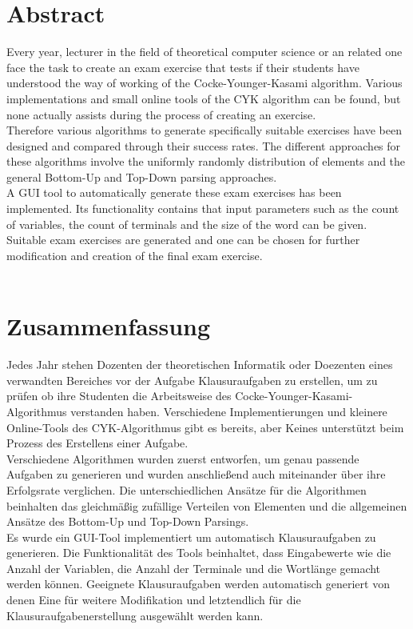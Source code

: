 \section*{Abstract}\label{abtract}
Every year, lecturer in the field of theoretical computer science or an related one face the task to create an exam exercise that tests if their students have understood the way of working of the Cocke-Younger-Kasami algorithm. Various implementations and small online tools of the CYK algorithm can be found, but none actually assists during the process of creating an exercise.\\
Therefore various algorithms to generate specifically suitable exercises have been designed and compared through their success rates. The different approaches for these algorithms involve the uniformly randomly distribution of elements and the general Bottom-Up and Top-Down parsing approaches.\\
A GUI tool to automatically generate these exam exercises has been implemented. Its functionality contains that input parameters such as the count of variables, the count of terminals and the size of the word can be given. Suitable exam exercises are generated and one can be chosen for further modification and creation of the final exam exercise.\\


~~

\section*{Zusammenfassung}\label{zusammenfassung}
Jedes Jahr stehen Dozenten der theoretischen Informatik oder Doezenten eines verwandten Bereiches vor der Aufgabe Klausuraufgaben zu erstellen, um zu prüfen ob ihre Studenten die Arbeitsweise des Cocke-Younger-Kasami-Algorithmus verstanden haben. Verschiedene Implementierungen und kleinere Online-Tools des CYK-Algorithmus gibt es bereits, aber Keines unterstützt beim Prozess des Erstellens einer Aufgabe.\\
Verschiedene Algorithmen wurden zuerst entworfen, um genau passende Aufgaben zu generieren und wurden anschließend auch miteinander über ihre Erfolgsrate verglichen. Die unterschiedlichen Ansätze für die Algorithmen beinhalten das gleichmäßig zufällige Verteilen von Elementen und die allgemeinen Ansätze des Bottom-Up und Top-Down Parsings.\\
Es wurde ein GUI-Tool implementiert um automatisch Klausuraufgaben zu generieren. Die Funktionalität des Tools beinhaltet, dass Eingabewerte wie die Anzahl der Variablen, die Anzahl der Terminale und die Wortlänge gemacht werden können. Geeignete Klausuraufgaben werden automatisch generiert von denen Eine für weitere Modifikation und letztendlich für die Klausuraufgabenerstellung ausgewählt werden kann.\\



\pagebreak

